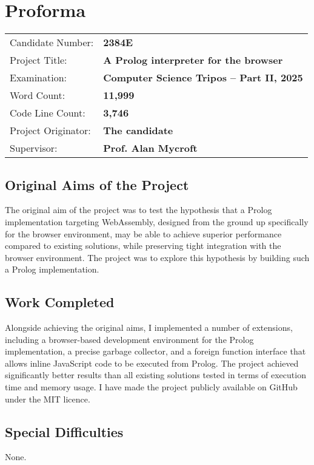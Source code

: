 \chapter*{Proforma}

{\large \begin{tabular}{ll}
Candidate Number: & {\bf 2384E} \\
Project Title: & {\bf A Prolog interpreter for the browser} \\
Examination: & {\bf Computer Science Tripos -- Part II, 2025} \\
Word Count: & {\bf 11,999}\footnotemark \\
Code Line Count: & {\bf 3,746}\footnotemark \\
Project Originator: & {\bf The candidate} \\
Supervisor: & {\bf Prof. Alan Mycroft}
\end{tabular}}


\section*{Original Aims of the Project}

The original aim of the project was to test the hypothesis that a Prolog implementation targeting WebAssembly, designed from the ground up specifically for the browser environment, may be able to achieve superior performance compared to existing solutions, while preserving tight integration with the browser environment. The project was to explore this hypothesis by building such a Prolog implementation.

\section*{Work Completed}

Alongside achieving the original aims, I implemented a number of extensions, including a browser-based development environment for the Prolog implementation, a precise garbage collector, and a foreign function interface that allows inline JavaScript code to be executed from Prolog. The project achieved significantly better results than all existing solutions tested in terms of execution time and memory usage. I have made the project publicly available on GitHub under the MIT licence.

\section*{Special Difficulties}

None.